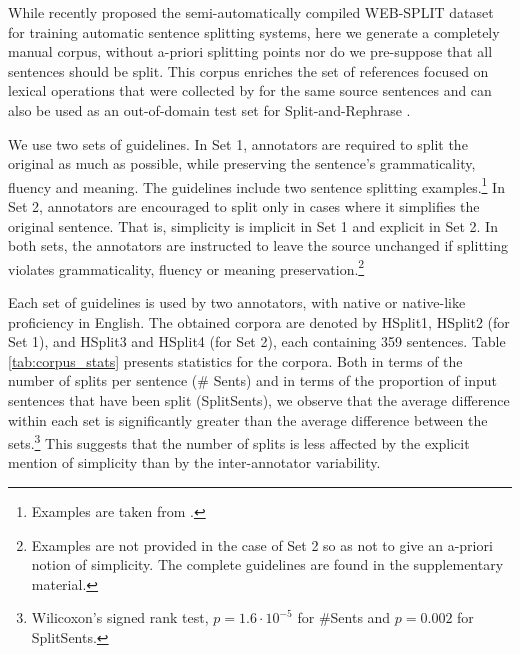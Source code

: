 \documentclass[11pt,a4paper]{article}
\begin{document}
While \citet{N17} recently proposed the semi-automatically compiled WEB-SPLIT dataset for training automatic sentence splitting systems, here we generate a completely manual corpus, without a-priori splitting points nor do we pre-suppose that all sentences should be split. This corpus enriches the set of references focused on lexical operations that were collected by \citet{Xu16} for the same source sentences and can also be used as an out-of-domain test set for Split-and-Rephrase \citep{N17}.

We use two sets of guidelines.
In Set 1, annotators are required to split the original as much as possible,
while preserving the sentence's grammaticality, fluency and meaning.
The guidelines include two sentence splitting examples.\footnote{Examples are taken from \citet{S06}.}
In Set 2, annotators are encouraged to split only in cases where it simplifies the original sentence.
That is, simplicity is implicit in Set 1 and explicit in Set 2. In both sets, the annotators are instructed to leave
the source unchanged if splitting violates grammaticality,
fluency or meaning preservation.\footnote{Examples are not provided in the case of Set 2 so as not to give an a-priori notion of simplicity. The complete guidelines are found in the supplementary material.} %

Each set of guidelines is used by two annotators, with native or native-like proficiency in English.
The obtained corpora are denoted by HSplit1, HSplit2 (for Set 1), and HSplit3 and HSplit4 (for Set 2), each containing 359 sentences. Table \ref{tab:corpus_stats} presents statistics for the corpora. Both in terms of the number of splits per sentence ($\#$ Sents) and in terms of the proportion of input sentences that have been split (SplitSents), we observe that the average difference within each set is significantly greater than the average difference between the sets.\footnote{Wilicoxon's signed rank test, $p = 1.6 \cdot 10^{-5}$ for $\#$Sents and $p = 0.002$ for SplitSents.}
This suggests that the number of splits is less affected by the explicit mention of simplicity than by the inter-annotator variability. 

\end{document}

